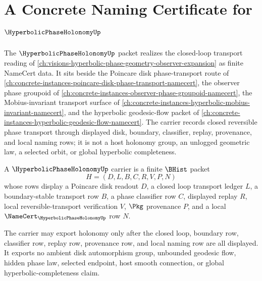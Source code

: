 \chapter{A Concrete Naming Certificate for $\HyperbolicPhaseHolonomyUp$}
\label{ch:concrete-instances-hyperbolic-phase-holonomy-namecert}

The $\HyperbolicPhaseHolonomyUp$ packet realizes the closed-loop transport reading of \autoref{ch:visions-hyperbolic-phase-geometry-observer-expansion} as finite NameCert data. It sits beside the Poincare disk phase-transport route of \autoref{ch:concrete-instances-poincare-disk-phase-transport-namecert}, the observer phase groupoid of \autoref{ch:concrete-instances-observer-phase-groupoid-namecert}, the Mobius-invariant transport surface of \autoref{ch:concrete-instances-hyperbolic-mobius-invariant-namecert}, and the hyperbolic geodesic-flow packet of \autoref{ch:concrete-instances-hyperbolic-geodesic-flow-namecert}. The carrier records closed reversible phase transport through displayed disk, boundary, classifier, replay, provenance, and local naming rows; it is not a host holonomy group, an unlogged geometric law, a selected orbit, or global hyperbolic completeness.

\begin{definition}
\label{def:hyperbolic-phase-holonomy-carrier}
A $\HyperbolicPhaseHolonomyUp$ carrier is a finite $\BHist$ packet
$$
H=(D,L,B,C,R,V,P,N)
$$
whose rows display a Poincare disk readout $D$, a closed loop transport ledger $L$, a boundary-stable transport row $B$, a phase classifier row $C$, displayed replay $R$, local reversible-transport verification $V$, $\Pkg$ provenance $P$, and a local $\NameCert_{\HyperbolicPhaseHolonomyUp}$ row $N$.

The carrier may export holonomy only after the closed loop, boundary row, classifier row, replay row, provenance row, and local naming row are all displayed. It exports no ambient disk automorphism group, unbounded geodesic flow, hidden phase law, selected endpoint, host smooth connection, or global hyperbolic-completeness claim.
\end{definition}

